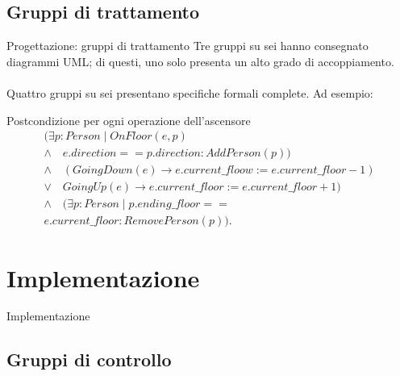 \documentclass{beamer}
\begin{document}
\subsection{Gruppi di trattamento}
\begin{frame}{Progettazione: gruppi di trattamento}
	Tre gruppi su sei hanno consegnato diagrammi UML; di questi, uno solo presenta
	un alto grado di accoppiamento.
	\\~\\
	Quattro gruppi su sei presentano specifiche formali complete. Ad esempio:
	\begin{exampleblock}{Postcondizione per ogni operazione dell'ascensore}
		\[
			\begin{array}{l}
				(\exists p : Person \mid OnFloor(e, p)                                               \\
				\wedge \quad e.direction == p.direction : AddPerson(p))                              \\
				\wedge \quad (GoingDown(e) \rightarrow e.current\_{}floow := e.current\_{}floor - 1) \\
				\vee \quad GoingUp(e) \rightarrow e.current\_{}floor := e.current\_{}floor + 1)      \\
				\wedge \quad (\exists p : Person \mid p.ending\_{}floor ==                           \\
				e.current\_{}floor : RemovePerson(p)).
			\end{array}
		\]
	\end{exampleblock}
\end{frame}

\section{Implementazione}
\begin{frame}
	\vfill
	\centering
	Implementazione
	\vfill
\end{frame}


\subsection{Gruppi di controllo}
\end{document}
